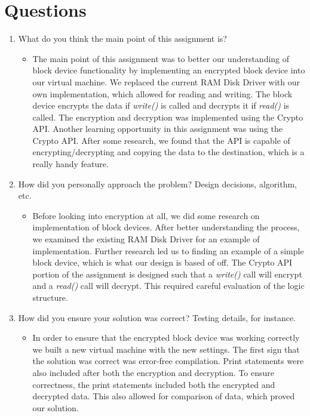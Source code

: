 \documentclass[letterpaper,10pt,onecolumn]{IEEEtran}
\begin{document}
    
    \vspace{6mm}
    
   
    \section*{Questions}
    \begin{enumerate}
        \item What do you think the main point of this assignment is?
        \begin{itemize}
            \item The main point of this assignment was to better our understanding of block device functionality by implementing an encrypted block device into our virtual machine. We replaced the current RAM Disk Driver with our own implementation, which allowed for reading and writing. The block device encrypts the data if \textit{write()} is called and decrypts it if \textit{read()} is called. The encryption and decryption was implemented using the Crypto API. Another learning opportunity in this assignment was using the Crypto API. After some research, we found that the API is capable of encrypting/decrypting and copying the data to the destination, which is a really handy feature.
        \end{itemize}
        \item How did you personally approach the problem? Design decisions, algorithm, etc.
        \begin{itemize}
            \item Before looking into encryption at all, we did some research on implementation of block devices. After better understanding the process, we examined the existing RAM Disk Driver for an example of implementation. Further research led us to finding an example of a simple block device, which is what our design is based of off. The Crypto API portion of the assignment is designed such that a \textit{write()} call will encrypt and a \textit{read()} call will decrypt. This required careful evaluation of the logic structure.
        \end{itemize}
        \item How did you ensure your solution was correct? Testing details, for instance.
        \begin{itemize}
            \item In order to ensure that the encrypted block device was working correctly we built a new virtual machine with the new settings. The first sign that the solution was correct was error-free compilation. Print statements were also included after both the encryption and decryption. To ensure correctness, the print statements included both the encrypted and decrypted data. This also allowed for comparison of data, which proved our solution.

\end{itemize}
\end{enumerate}
\end{document}
